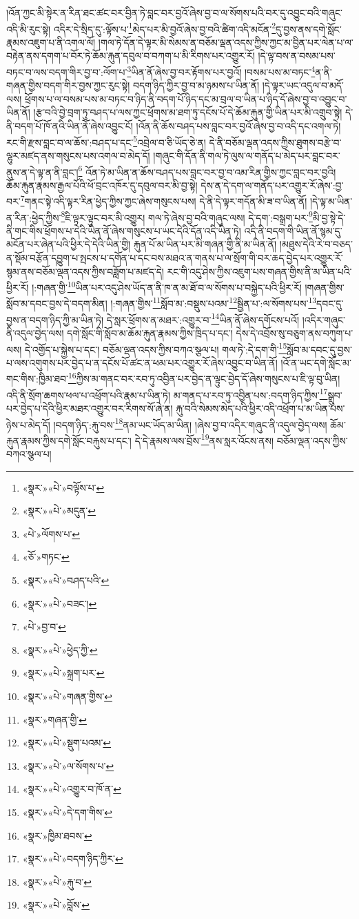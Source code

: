 །འོན་ཀྱང་མི་སྟེར་ན་རིན་ཐང་ཚང་བར་བྱིན་ཏེ་བླང་བར་བྱའོ་ཞེས་བྱ་བ་ལ་སོགས་པའི་བར་དུ་འབྱུང་བའི་གཞུང་འདི་མི་རུང་སྟེ། འདིར་དེ་སྲིད་དུ་:ལྟོས་པ་\footnote{«སྣར་»«པེ་»བལྟོས་པ་}མེད་པར་མི་བྱའོ་ཞེས་བྱ་བའི་ཚིག་འདི་མངོན་\footnote{«སྣར་»«པེ་»མདུན་}དུ་བྱས་ནས་དགེ་སློང་རྣམས་འཇུག་པ་ནི་འགལ་ལོ། །གལ་ཏེ་དོན་དེ་ལྟར་མི་སེམས་ན་བཅོམ་ལྡན་འདས་ཀྱིས་ཀྱང་མ་བྱིན་པར་ལེན་པ་ལ་བརྟེན་ནས་དགག་པ་བོར་ཏེ་ཆོམ་རྐུན་དབུལ་བ་བཀག་པ་མི་རིགས་པར་འགྱུར་རོ། །དེ་ལྟ་བས་ན་བསམ་པས་བཏང་བ་ལས་བདག་གིར་བྱ་བ་:ལོག་པ་\footnote{«པེ་»ལོགས་པ་}ཡིན་ནོ་ཞེས་བྱ་བར་རྟོགས་པར་བྱའོ། །བསམ་པས་མ་བཏང་\footnote{«ཅོ་»གཏང་}ན་ནི་གཞན་གྱིས་བདག་གིར་བྱས་ཀྱང་རུང་སྟེ། བདག་ཉིད་ཀྱིར་བྱ་བ་མ་ཉམས་པ་ཡིན་ནོ། །དེ་ལྟར་ཡང་འདུལ་བ་མདོ་ལས། ཕྲོགས་པ་ལ་བསམ་པས་མ་བཏང་བ་ཉིད་ནི་བདག་པོ་ཉིད་དང་མ་བྲལ་བ་ཡིན་པ་ཉིད་དོ་ཞེས་བྱ་བ་འབྱུང་བ་ཡིན་ནོ། །རྩ་བའི་བྱེ་བྲག་ཏུ་བཤད་པ་ལས་ཀྱང་ཕྲོགས་མ་ཐག་ཏུ་དངོས་པོ་དེ་ཆོམ་རྐུན་གྱི་ཡིན་པར་མི་འགྲུབ་སྟེ། དེ་ནི་བདག་པོ་ཁོ་ནའི་ཡིན་ནོ་ཞེས་འབྱུང་ངོ། །འོན་ནི་ཆོས་བཤད་པས་བླང་བར་བྱའོ་ཞེས་བྱ་བ་འདི་དང་འགལ་ཏེ། རང་གི་རྫས་བླང་བ་ལ་ཆོས་:བཤད་པ་དང་\footnote{«སྣར་»«པེ་»བཤད་པའི་}འབྲེལ་བ་ཅི་ཡོད་ཅེ་ན། དེ་ནི་བཅོམ་ལྡན་འདས་ཀྱིས་ཐུགས་བརྩེ་བ་ལྷུར་མཛད་ནས་གསུངས་པས་འགལ་བ་མེད་དོ། །གཞུང་གི་དོན་ནི་གལ་ཏེ་ལུས་ལ་གནོད་པ་མེད་པར་བླང་བར་ནུས་ན་དེ་ལྟ་ན་ནི་བླང་།\footnote{«སྣར་»«པེ་»བཟང་།} འོན་ཏེ་མ་ཡིན་ན་ཆོས་བཤད་པས་བླང་བར་བྱ་བ་འམ་རིན་གྱིས་ཀྱང་བླང་བར་བྱའི། ཆོམ་རྐུན་རྣམས་རྒྱལ་པོའི་ཕོ་བྲང་འཁོར་དུ་དབུལ་བར་མི་བྱ་སྟེ། དེས་ན་དེ་དག་ལ་གནོད་པར་འགྱུར་རོ་ཞེས་:བྱ་བར་\footnote{«པེ་»བྱ་བ་}གནང་སྟེ་འདི་ལྟར་རིན་ཕྱེད་ཀྱིས་ཀྱང་ཞེས་གསུངས་པས། དེ་ནི་དེ་ལྟར་གདོན་མི་ཟ་བ་ཡིན་ནོ། །དེ་ལྟ་མ་ཡིན་ན་རིན་:ཕྱེད་ཀྱིས་\footnote{«སྣར་»«པེ་»ཕྱེད་ཀྱི་}ཇི་ལྟར་ལྟུང་བར་མི་འགྱུར། གལ་ཏེ་ཞེས་བྱ་བའི་གཞུང་ལས། དེ་དག་:བསྒྲག་པར་\footnote{«སྣར་»«པེ་»སྐྲག་པར་}མི་བྱ་སྟེ་དེ་ནི་གང་གིས་ཕྲོགས་པ་དེའི་ཡིན་ནོ་ཞེས་གསུངས་པ་ཡང་དེའི་དོན་འདི་ཡིན་ཏེ། འདི་ནི་བདག་གི་ཡིན་ནོ་སྙམ་དུ་མངོན་པར་ཞེན་པའི་ཕྱིར་དེ་དེའི་ཡིན་གྱི། རྐུན་པོ་མ་ཡིན་པར་མི་གཞན་གྱི་ནི་མ་ཡིན་ནོ། །མཐུས་དེའི་རེ་བ་བཅད་ན་སྡོམ་བརྩོན་དབྱུག་པ་སྤངས་པ་དགོན་པ་དང་བས་མཐའ་ན་གནས་པ་ལ་སྲོག་གི་བར་ཆད་བྱེད་པར་འགྱུར་རོ་སྙམ་ནས་བཅོམ་ལྡན་འདས་ཀྱིས་བཟློག་པ་མཛད་དེ། རང་གི་འདུ་ཤེས་ཀྱིས་འཇུག་པས་གཞན་གྱིས་ནི་མ་ཡིན་པའི་ཕྱིར་རོ། །:གཞན་གྱི་\footnote{«སྣར་»«པེ་»གཞན་གྱིས་}ཡིན་པར་འདུ་ཤེས་ཡོད་ན་ནི་ཁ་ན་མ་ཐོ་བ་ལ་སོགས་པ་བསྐྱེད་པའི་ཕྱིར་རོ། །གཞན་གྱིས་སློབ་མ་དབང་བྱས་དེ་བདག་མིན། །:གཞན་གྱིས་\footnote{«སྣར་»གཞན་གྱི་}སློབ་མ་:བསྡུས་པའམ་\footnote{«སྣར་»«པེ་»སྡུག་པའམ་}སྦྱིན་པ་:ལ་སོགས་པས་\footnote{«སྣར་»«པེ་»ལ་སོགས་པ་}དབང་དུ་བྱས་ན་བདག་ཉིད་ཀྱི་མ་ཡིན་ཏེ། དེ་སླར་ཕྲོགས་ན་མཐར་:འགྱུར་བ་\footnote{«སྣར་»«པེ་»འགྱུར་བ་ཁོ་ན་}ཡིན་ནོ་ཞེས་དགོངས་པའོ། །འདིར་གཞུང་ནི་འདུལ་བྱེད་ལས། དགེ་སློང་གི་སློབ་མ་ཆོམ་རྐུན་རྣམས་ཀྱིས་ཁྲིད་པ་དང་། དེས་དེ་འབྲོས་སུ་བཅུག་ནས་བཀུག་པ་ལས། དེ་འགྱོད་པ་སྐྱེས་པ་དང་། བཅོམ་ལྡན་འདས་ཀྱིས་བཀའ་སྩལ་པ། གལ་ཏེ་:དེ་དག་གི་\footnote{«སྣར་»«པེ་»དེ་དག་གིས་}སློབ་མ་དབང་དུ་བྱས་པ་ལས་འགུགས་པར་བྱེད་པ་ན་དངོས་པོ་ཚང་ན་ཕམ་པར་འགྱུར་རོ་ཞེས་འབྱུང་བ་ཡིན་ནོ། །འོ་ན་ཡང་དགེ་སློང་མ་གང་གིས་:ཁྱིམ་ཐབ་\footnote{«སྣར་»ཁྱིམ་ཐབས་}ཀྱིས་མ་གནང་བར་རབ་ཏུ་འབྱིན་པར་བྱེད་ན་ལྟུང་བྱེད་དོ་ཞེས་གསུངས་པ་ཇི་ལྟ་བུ་ཡིན། འདི་ནི་སྲོག་ཆགས་ཕལ་པ་འཕྲོག་པའི་རྣམ་པ་ཡིན་ཏེ། མ་གནད་པ་རབ་ཏུ་འབྱིན་པས་:བདག་ཉིད་ཀྱིས་\footnote{«སྣར་»«པེ་»བདག་ཉིད་ཀྱིར་}སྒྲུབ་པར་བྱེད་པ་དེའི་ཕྱིར་མཐར་འགྱུར་བར་རིགས་སོ་ཞེ་ན། རྐུ་བའི་སེམས་མེད་པའི་ཕྱིར་འདི་འཕྲོག་པ་མ་ཡིན་པས་ཉེས་པ་མེད་དོ། །བདག་ཉིད་:རྐུ་བས་\footnote{«སྣར་»«པེ་»རྐུ་བ་}ནམ་ཡང་ཡོད་མ་ཡིན། །ཞེས་བྱ་བ་འདིར་གཞུང་ནི་འདུལ་བྱེད་ལས། ཆོམ་རྐུན་རྣམས་ཀྱིས་དགེ་སློང་བརྐུས་པ་དང་། དེ་དེ་རྣམས་ལས་བྲོས་\footnote{«སྣར་»«པེ་»བློས་}ནས་སླར་འོངས་ནས། བཅོམ་ལྡན་འདས་ཀྱིས་བཀའ་སྩལ་པ། 
